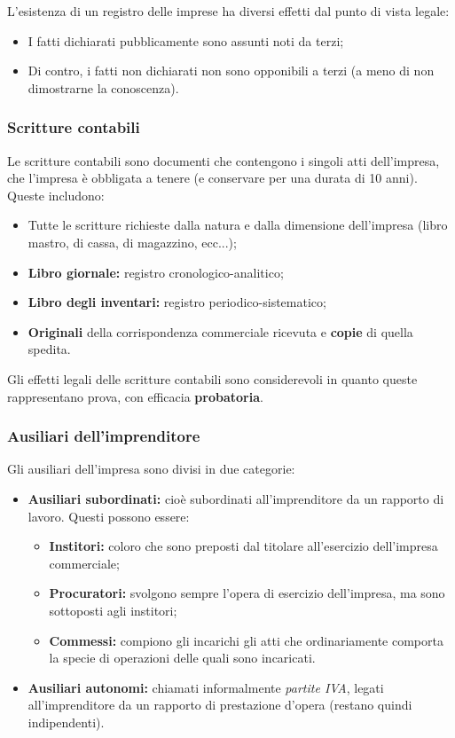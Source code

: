 \documentclass[a4paper,11pt]{article}
\begin{document}
L'esistenza di un registro delle imprese ha diversi effetti dal punto di vista legale:
\begin{itemize}
	\item I fatti dichiarati pubblicamente sono assunti noti da terzi;
	\item Di contro, i fatti non dichiarati non sono opponibili a terzi (a meno di non dimostrarne la conoscenza).
\end{itemize}

\subsubsection{Scritture contabili}
Le scritture contabili sono documenti che contengono i singoli atti dell'impresa, che l'impresa è obbligata a tenere (e conservare per una durata di 10 anni).
Queste includono:
\begin{itemize}
	\item Tutte le scritture richieste dalla natura e dalla dimensione dell'impresa (libro mastro, di cassa, di magazzino, ecc...);
	\item \textbf{Libro giornale:} registro cronologico-analitico;
	\item \textbf{Libro degli inventari:} registro periodico-sistematico;
	\item \textbf{Originali} della corrispondenza commerciale ricevuta e \textbf{copie} di quella spedita.
\end{itemize}

Gli effetti legali delle scritture contabili sono considerevoli in quanto queste rappresentano prova, con efficacia \textbf{probatoria}.

\subsubsection{Ausiliari dell'imprenditore}
Gli ausiliari dell'impresa sono divisi in due categorie:
\begin{itemize}
	\item \textbf{Ausiliari subordinati:} cioè subordinati all'imprenditore da un rapporto di lavoro. Questi possono essere:
		\begin{itemize}
			\item \textbf{Institori:} coloro che sono preposti dal titolare all'esercizio dell'impresa commerciale;
			\item \textbf{Procuratori:} svolgono sempre l'opera di esercizio dell'impresa, ma sono sottoposti agli institori;
			\item \textbf{Commessi:} compiono gli incarichi gli atti che ordinariamente comporta la specie di operazioni delle quali sono incaricati.
		\end{itemize}
	\item \textbf{Ausiliari autonomi:} chiamati informalmente \textit{partite IVA}, legati all'imprenditore da un rapporto di prestazione d'opera (restano quindi indipendenti).
\end{itemize}
\end{document}
